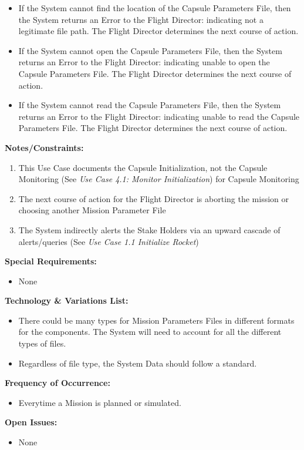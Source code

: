\documentclass[letterpaper]{article}
\begin{document}
\begin{itemize}
\item[2a,3a]If the System cannot find the location of the Capsule 
Parameters File, then the System returns an Error to the Flight 
Director:  indicating not a legitimate file path.  The Flight Director
determines the next course of action.
\item[4a]If the System cannot open the Capsule Parameters File, then
the System returns an Error to the Flight Director:  indicating unable
to open the Capsule Parameters File.  The Flight Director determines
the next course of action.
\item[5a]If the System cannot read the Capsule Parameters File, then
the System returns an Error to the Flight Director:  indicating unable
to read the Capsule Parameters File.  The Flight Director determines
the next course of action.
\end{itemize}
\textbf{Notes/Constraints:}
\begin{enumerate}
   \item[*a]This Use Case documents the Capsule Initialization, not 
      the Capsule Monitoring (See 
      \textit{Use Case 4.1:  Monitor Initialization}) for Capsule 
      Monitoring
   \item[*b]The next course of action for the Flight Director is
      aborting the mission or choosing another Mission Parameter File
   \item[6a]The System indirectly alerts the Stake Holders via an 
      upward cascade of alerts/queries (See 
      \textit{Use Case 1.1 Initialize Rocket})
\end{enumerate}
\textbf{Special Requirements:}
\begin{itemize}
   \item None
\end{itemize}
\textbf{Technology \& Variations List:}
\begin{itemize}
   \item There could be many types for Mission Parameters Files in 
      different formats for the components.  The System will need to
      account for all the different types of files.
   \item Regardless of file type, the System Data should follow a 
      standard.
\end{itemize}
\textbf{Frequency of Occurrence:}
\begin{itemize}
   \item Everytime a Mission is planned or simulated.
\end{itemize}
\textbf{Open Issues:}
\begin{itemize}
   \item None
\end{itemize}
\end{document}
